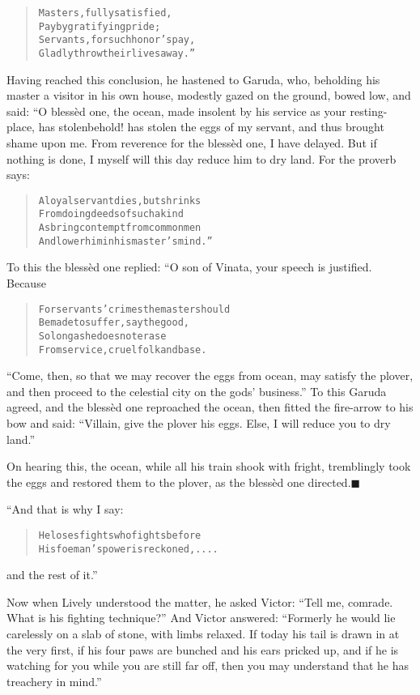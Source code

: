 \documentclass[article, twoside, 14pt]{memoir}
\newcommand{\qed}{\hfill \ensuremath{\blacksquare}}
\renewenvironment{verbatim}{%
\begin{quote}%
\vskip -10pt%
\begin{alltt}\normalfont\large}{\end{alltt}%
\end{quote}%
\vskip -10pt
} %
\begin{document}
\begin{verbatim}
Masters, fully satisfied,
Pay by gratifying pride;
Servants, for such honor's pay,
Gladly throw their lives away.”
\end{verbatim}
Having reached this conclusion, he hastened to Garuda, who,
beholding his master a visitor in his own house, modestly gazed on
the ground, bowed low, and said: “O blessèd one, the ocean, made
insolent by his service as your resting-place, has stolen{\textemdash}behold!
has stolen the eggs of my servant, and thus brought shame upon me.
From reverence for the blessèd one, I have delayed. But if nothing
is done, I myself will this day reduce him to dry land. For the
proverb says:

\begin{verbatim}
A loyal servant dies, but shrinks
    From doing deeds of such a kind
As bring contempt from common men
    And lower him in his master's mind.”
\end{verbatim}
To this the blessèd one replied: “O son of Vinata, your speech is
justified. Because

\begin{verbatim}
For servants' crimes the master should
Be made to suffer, say the good,
So long as he does not erase
From service, cruel folk and base.
\end{verbatim}
``Come, then, so that we may recover the eggs from ocean, may satisfy the plover, and then proceed to the celestial city on the gods' business.''
To this Garuda agreed, and the blessèd one reproached the ocean,
then fitted the fire-arrow to his bow and said:
``Villain, give the plover his eggs. Else, I will reduce you to dry land.''

On hearing this, the ocean, while all his train shook with fright,
tremblingly took the eggs and restored them to the plover, as the
blessèd one directed.\hyperref[s18]{\qed}

“And that is why I say:

\begin{verbatim}
He loses fights who fights before
    His foeman's power is reckoned, ....
\end{verbatim}
and the rest of it.”

Now when Lively understood the matter, he asked Victor:
``Tell me, comrade. What is his fighting technique?'' And Victor
answered:
``Formerly he would lie carelessly on a slab of stone, with limbs relaxed. If today his tail is drawn in at the very first, if his four paws are bunched and his ears pricked up, and if he is watching for you while you are still far off, then you may understand that he has treachery in mind.''
\end{document}
